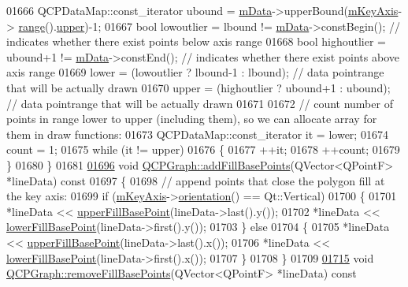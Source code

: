 \begin{DoxyCode}
01666   QCPDataMap::const\_iterator ubound = \hyperlink{a00031_a8457c840f69a0ac49f61d30a509c5d08}{mData}->upperBound(\hyperlink{a00024_a692421b963472fa6e16156a74ba96832}{mKeyAxis}->
      \hyperlink{a00025_ab1ea79a4f5ea4cf42620f8f51c477ac4}{range}().\hyperlink{a00049_ae44eb3aafe1d0e2ed34b499b6d2e074f}{upper})-1;
01667   \textcolor{keywordtype}{bool} lowoutlier = lbound != \hyperlink{a00031_a8457c840f69a0ac49f61d30a509c5d08}{mData}->constBegin(); \textcolor{comment}{// indicates whether there exist points below axis
       range}
01668   \textcolor{keywordtype}{bool} highoutlier = ubound+1 != \hyperlink{a00031_a8457c840f69a0ac49f61d30a509c5d08}{mData}->constEnd(); \textcolor{comment}{// indicates whether there exist points above axis
       range}
01669   lower = (lowoutlier ? lbound-1 : lbound); \textcolor{comment}{// data pointrange that will be actually drawn}
01670   upper = (highoutlier ? ubound+1 : ubound); \textcolor{comment}{// data pointrange that will be actually drawn}
01671   
01672   \textcolor{comment}{// count number of points in range lower to upper (including them), so we can allocate array for them in
       draw functions:}
01673   QCPDataMap::const\_iterator it = lower;
01674   count = 1;
01675   \textcolor{keywordflow}{while} (it != upper)
01676   \{
01677     ++it;
01678     ++count;
01679   \}
01680 \}
01681 
\hypertarget{a00115_source_l01696}{}\hyperlink{a00031_a5fa7884620d7c54b81dfbd255d97b636}{01696} \textcolor{keywordtype}{void} \hyperlink{a00031_a5fa7884620d7c54b81dfbd255d97b636}{QCPGraph::addFillBasePoints}(QVector<QPointF> *lineData)\textcolor{keyword}{ const}
01697 \textcolor{keyword}{}\{
01698   \textcolor{comment}{// append points that close the polygon fill at the key axis:}
01699   \textcolor{keywordflow}{if} (\hyperlink{a00024_a692421b963472fa6e16156a74ba96832}{mKeyAxis}->\hyperlink{a00025_a57483f2f60145ddc9e63f3af53959265}{orientation}() == Qt::Vertical)
01700   \{
01701     *lineData << \hyperlink{a00031_a363d066c179e0f46cc93c12bafb0bfba}{upperFillBasePoint}(lineData->last().y());
01702     *lineData << \hyperlink{a00031_a41f982e8ceaefe6a53eb7432f26d64b6}{lowerFillBasePoint}(lineData->first().y());
01703   \} \textcolor{keywordflow}{else}
01704   \{
01705     *lineData << \hyperlink{a00031_a363d066c179e0f46cc93c12bafb0bfba}{upperFillBasePoint}(lineData->last().x());
01706     *lineData << \hyperlink{a00031_a41f982e8ceaefe6a53eb7432f26d64b6}{lowerFillBasePoint}(lineData->first().x());
01707   \}
01708 \}
01709 
\hypertarget{a00115_source_l01715}{}\hyperlink{a00031_ad31b49a90e91e538fd9caf011c913a68}{01715} \textcolor{keywordtype}{void} \hyperlink{a00031_ad31b49a90e91e538fd9caf011c913a68}{QCPGraph::removeFillBasePoints}(QVector<QPointF> *lineData)\textcolor{keyword}{ const}

\end{DoxyCode}
